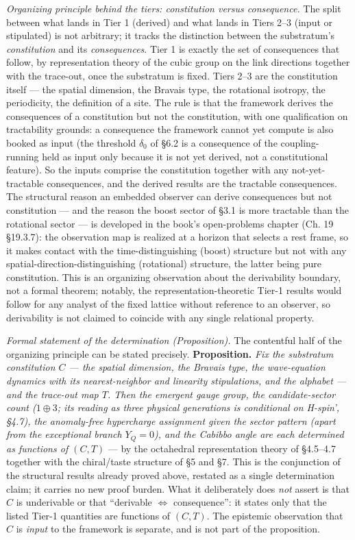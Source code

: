 \documentclass[
]{article}
\begin{document}
\emph{Organizing principle behind the tiers: constitution versus
consequence.} The split between what lands in Tier 1 (derived) and what
lands in Tiers 2--3 (input or stipulated) is not arbitrary; it tracks
the distinction between the substratum's \emph{constitution} and its
\emph{consequences}. Tier 1 is exactly the set of consequences that
follow, by representation theory of the cubic group on the link
directions together with the trace-out, once the substratum is fixed.
Tiers 2--3 are the constitution itself --- the spatial dimension, the
Bravais type, the rotational isotropy, the periodicity, the definition
of a site. The rule is that the framework derives the consequences of a
constitution but not the constitution, with one qualification on
tractability grounds: a consequence the framework cannot yet compute is
also booked as input (the threshold \(\delta_0\) of §6.2 is a
consequence of the coupling-running held as input only because it is not
yet derived, not a constitutional feature). So the inputs comprise the
constitution together with any not-yet-tractable consequences, and the
derived results are the tractable consequences. The structural reason an
embedded observer can derive consequences but not constitution --- and
the reason the boost sector of §3.1 is more tractable than the
rotational sector --- is developed in the book's open-problems chapter
(Ch. 19 §19.3.7): the observation map is realized at a horizon that
selects a rest frame, so it makes contact with the time-distinguishing
(boost) structure but not with any spatial-direction-distinguishing
(rotational) structure, the latter being pure constitution. This is an
organizing observation about the derivability boundary, not a formal
theorem; notably, the representation-theoretic Tier-1 results would
follow for any analyst of the fixed lattice without reference to an
observer, so derivability is not claimed to coincide with any single
relational property.

\emph{Formal statement of the determination (Proposition).} The
contentful half of the organizing principle can be stated precisely.
\textbf{Proposition.} \emph{Fix the substratum constitution \(C\) ---
the spatial dimension, the Bravais type, the wave-equation dynamics with
its nearest-neighbor and linearity stipulations, and the alphabet ---
and the trace-out map \(T\). Then the emergent gauge group, the
candidate-sector count (\(1 \oplus 3\); its reading as three physical
generations is conditional on H-spin', §4.7), the anomaly-free
hypercharge assignment given the sector pattern (apart from the
exceptional branch \(Y_Q=0\)), and the Cabibbo angle are each determined
as functions of \((C,T)\)} --- by the octahedral representation theory
of §4.5--4.7 together with the chiral/taste structure of §5 and §7. This
is the conjunction of the structural results already proved above,
restated as a single determination claim; it carries no new proof
burden. What it deliberately does \emph{not} assert is that \(C\) is
underivable or that ``derivable \(\Leftrightarrow\) consequence'': it
states only that the listed Tier-1 quantities are functions of
\((C,T)\). The epistemic observation that \(C\) is \emph{input} to the
framework is separate, and is not part of the proposition.
\end{document}
